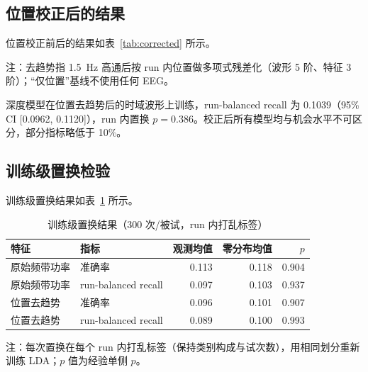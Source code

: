 \documentclass[twocolumn,10pt]{ctexart}
\begin{document}
\subsection{位置校正后的结果}

位置校正前后的结果如表~\ref{tab:corrected} 所示。

\begin{table}[H]
\centering
\caption{1.5~Hz 高通与位置去趋势后的结果（5 被试合并）}
\label{tab:corrected}
\footnotesize
{}
\vspace{0.2em}
\parbox{\columnwidth}{\scriptsize 注：去趋势指 1.5~Hz 高通后按 run 内位置做多项式残差化（波形 5 阶、特征 3 阶）；“仅位置”基线不使用任何 EEG。}
\end{table}

深度模型在位置去趋势后的时域波形上训练，run-balanced recall 为 0.1039（95\% CI [0.0962, 0.1120]），run 内置换 $p=0.386$。校正后所有模型均与机会水平不可区分，部分指标略低于 10\%。

\subsection{训练级置换检验}

训练级置换结果如表~\ref{tab:perm} 所示。

\begin{table}[H]
\centering
\caption{训练级置换结果（300 次/被试，run 内打乱标签）}
\label{tab:perm}
\footnotesize
\begin{tabular}{llrrr}
\toprule
特征 & 指标 & 观测均值 & 零分布均值 & $p$ \\
\midrule
原始频带功率 & 准确率 & 0.113 & 0.118 & 0.904 \\
原始频带功率 & run-balanced recall & 0.097 & 0.103 & 0.937 \\
位置去趋势 & 准确率 & 0.096 & 0.101 & 0.907 \\
位置去趋势 & run-balanced recall & 0.089 & 0.100 & 0.993 \\
\bottomrule
\end{tabular}

\vspace{0.2em}
\parbox{\columnwidth}{\scriptsize 注：每次置换在每个 run 内打乱标签（保持类别构成与试次数），用相同划分重新训练 LDA；$p$ 值为经验单侧 $p$。}
\end{table}
\end{document}
